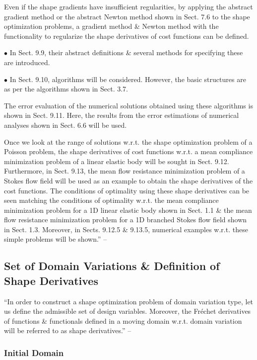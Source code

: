 \documentclass[oneside]{book}
\numberwithin{equation}{section}
\begin{document}
\begin{enumerate*}
	Even if the shape gradients have insufficient regularities, by applying the abstract gradient method or the abstract Newton method shown in Sect. 7.6 to the shape optimization problems, a gradient method \& Newton method with the functionality to regularize the shape derivatives of cost functions can be defined.
	\item[$\bullet$] In Sect. 9.9, their abstract definitions \& several methods for specifying these are introduced.
	\item[$\bullet$] In Sect. 9.10, algorithms will be considered. However, the basic structures are as per the algorithms shown in Sect. 3.7.
	\item The error evaluation of the numerical solutions obtained using these algorithms is shown in Sect. 9.11. Here, the results from the error estimations of numerical analyses shown in Sect. 6.6 will be used.
\end{enumerate*}

Once we look at the range of solutions w.r.t. the shape optimization problem of a Poisson problem, the shape derivatives of cost functions w.r.t. a mean compliance minimization problem of a linear elastic body will be sought in Sect. 9.12. Furthermore, in Sect. 9.13, the mean flow resistance minimization problem of a Stokes flow field will be used as an example to obtain the shape derivatives of the cost functions. The conditions of optimality using these shape derivatives can be seen matching the conditions of optimality w.r.t. the mean compliance minimization problem for a 1D linear elastic body shown in Sect. 1.1 \& the mean flow resistance minimization problem for a 1D branched Stokes flow field shown in Sect. 1.3. Moreover, in Sects. 9.12.5 \& 9.13.5, numerical examples w.r.t. these simple problems will be shown.'' -- \cite[pp. 427--431]{Azegami2020}

\subsection{Set of Domain Variations \& Definition of Shape Derivatives}
``In order to construct a shape optimization problem of domain variation type, let us define the admissible set of design variables. Moreover, the Fr\'echet derivatives of functions \& functionals defined in a moving domain w.r.t. domain variation will be referred to as shape derivatives.'' -- \cite[p. 431]{Azegami2020}

\subsubsection{Initial Domain}
\end{document}
